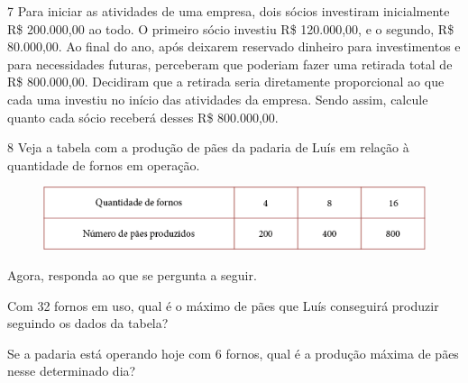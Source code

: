 
\num{7} Para iniciar as atividades de uma empresa, dois sócios investiram
inicialmente R\$ 200.000,00 ao todo. O primeiro
sócio investiu R\$ 120.000,00, e o segundo, R\$ 80.000,00. Ao final do ano,
após deixarem reservado dinheiro para investimentos e para necessidades
futuras, perceberam que poderiam fazer uma retirada total 
de R\$ 800.000,00. Decidiram que a retirada seria diretamente proporcional ao que
cada uma investiu no início das atividades da empresa. Sendo assim,
calcule quanto cada sócio receberá desses R\$ 800.000,00.


\num{8} Veja a tabela com a produção de pães da padaria de Luís 
em relação à quantidade de fornos em operação.

\begin{figure}[htpb!]
\centering
\includegraphics[width=\textwidth]{media/image71.png}
\end{figure}

Agora, responda ao que se pergunta a seguir.

\begin{escolha}
\item
  Com 32 fornos em uso, qual é o máximo de pães que Luís conseguirá
  produzir seguindo os dados da tabela?\\

\item
  Se a padaria está operando hoje com 6 fornos, qual é a produção máxima
  de pães nesse determinado dia?\\
\end{escolha}

